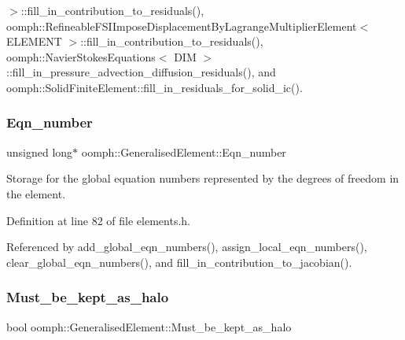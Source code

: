 $>$\+::fill\+\_\+in\+\_\+contribution\+\_\+to\+\_\+residuals(), oomph\+::\+Refineable\+F\+S\+I\+Impose\+Displacement\+By\+Lagrange\+Multiplier\+Element$<$ E\+L\+E\+M\+E\+N\+T $>$\+::fill\+\_\+in\+\_\+contribution\+\_\+to\+\_\+residuals(), oomph\+::\+Navier\+Stokes\+Equations$<$ D\+I\+M $>$\+::fill\+\_\+in\+\_\+pressure\+\_\+advection\+\_\+diffusion\+\_\+residuals(), and oomph\+::\+Solid\+Finite\+Element\+::fill\+\_\+in\+\_\+residuals\+\_\+for\+\_\+solid\+\_\+ic().

\mbox{\label{classoomph_1_1GeneralisedElement_a26e06e097f06b11892645d725ef85890}} 
\subsubsection{\texorpdfstring{Eqn\+\_\+number}{Eqn\_number}}
{\footnotesize\ttfamily unsigned long$\ast$ oomph\+::\+Generalised\+Element\+::\+Eqn\+\_\+number\hspace{0.3cm}{\ttfamily [private]}}



Storage for the global equation numbers represented by the degrees of freedom in the element. 



Definition at line 82 of file elements.\+h.



Referenced by add\+\_\+global\+\_\+eqn\+\_\+numbers(), assign\+\_\+local\+\_\+eqn\+\_\+numbers(), clear\+\_\+global\+\_\+eqn\+\_\+numbers(), and fill\+\_\+in\+\_\+contribution\+\_\+to\+\_\+jacobian().

\mbox{\label{classoomph_1_1GeneralisedElement_a14ec40733415a0f903fa4c355a004f5f}} 
\subsubsection{\texorpdfstring{Must\+\_\+be\+\_\+kept\+\_\+as\+\_\+halo}{Must\_be\_kept\_as\_halo}}
{\footnotesize\ttfamily bool oomph\+::\+Generalised\+Element\+::\+Must\+\_\+be\+\_\+kept\+\_\+as\+\_\+halo\hspace{0.3cm}{\ttfamily [protected]}}



